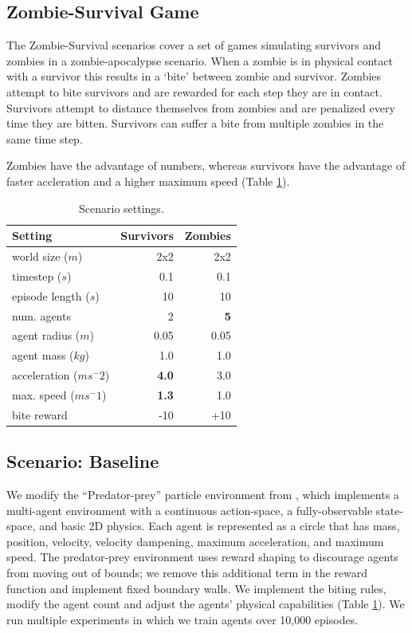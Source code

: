 \documentclass[11pt,a4paper]{article}
\begin{document}
\subsection{Zombie-Survival Game}
\label{sec:game}

The Zombie-Survival scenarios cover a set of games simulating survivors and zombies in a zombie-apocalypse scenario.
When a zombie is in physical contact with a survivor this results in a `bite' between zombie and survivor.
Zombies attempt to bite survivors and are rewarded for each step they are in contact.
Survivors attempt to distance themselves from zombies and are penalized every time they are bitten.
Survivors can suffer a bite from multiple zombies in the same time step.

Zombies have the advantage of numbers, whereas survivors have the advantage of faster accleration and a higher maximum speed (Table \ref{game-settings}).

\begin{table}
\centering
\begin{tabular}{lrr}
\hline \textbf{Setting} & \textbf{Survivors} & \textbf{Zombies} \\ \hline
  world size ($m$) & 2x2 & 2x2 \\
  timestep ($s$) & 0.1 & 0.1 \\
  episode length ($s$) & 10 & 10 \\
  num. agents & 2 & \textbf{5} \\
  agent radius ($m$) & 0.05 & 0.05 \\
  agent mass ($kg$) & 1.0 & 1.0 \\
  acceleration ($ms^-2$) & \textbf{4.0} & 3.0 \\
  max. speed ($ms^-1$) & \textbf{1.3} & 1.0 \\
  bite reward & -10 & +10 \\
\hline
\end{tabular}
\caption{\label{game-settings} Scenario settings. }
\end{table}

\subsection{Scenario: Baseline}
\label{sec:baseline}

We modify the ``Predator-prey'' particle environment from \citealp{lowe2020multiagent}, which implements a multi-agent environment with a continuous action-space, a fully-observable state-space, and basic 2D physics.
Each agent is represented as a circle that has mass, position, velocity, velocity dampening, maximum acceleration, and maximum speed.
The predator-prey environment uses reward shaping to discourage agents from moving out of bounds; we remove this additional term in the reward function and implement fixed boundary walls.
We implement the biting rules, modify the agent count and adjust the agents' physical capabilities (Table \ref{game-settings}).
We run multiple experiments in which we train agents over 10,000 episodes.
\end{document}
